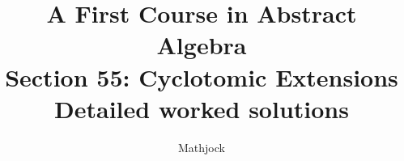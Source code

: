 
\title{\textbf{A First Course in Abstract Algebra}\\[0.3em]Section 55: Cyclotomic Extensions\\[0.3em]\large Detailed worked solutions}
\author{Mathjock}
\date{}

\maketitle
\bookinfo
\tableofcontents
\clearpage
\renewcommand{\thesection}{55}
\renewcommand{\theHsection}{fraleigh.55}


